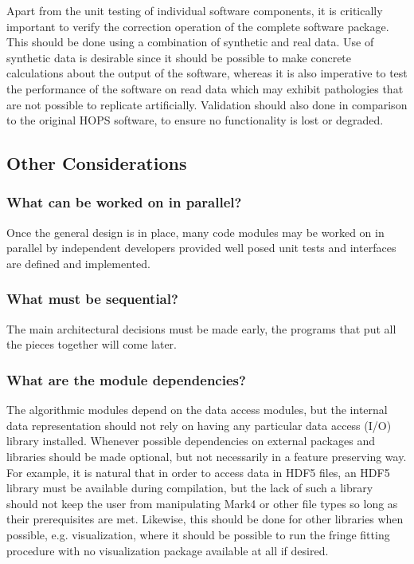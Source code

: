 Apart from the unit testing of individual software components, it is critically important to verify the correction operation of the complete software package. This should be done
using a combination of synthetic and real data. Use of synthetic data is desirable since it should be possible to make concrete calculations about the output of the software, whereas
it is also imperative to test the performance of the software on read data which may exhibit pathologies that are not possible to replicate artificially. Validation should also done
in comparison to the original HOPS software, to ensure no functionality is lost or degraded.

\subsection{Other Considerations}
\label{sec:otherstuff}


\subsubsection{What can be worked on in parallel?}
\label{sec:parallel-work}
Once the general design is in place, many code modules may
be worked on in parallel by independent developers provided
well posed unit tests and interfaces are defined and implemented.


\subsubsection{What must be sequential?}
\label{sec:sequential-work}
The main architectural decisions must be made early, the
programs that put all the pieces together will come later.

\subsubsection{What are the module dependencies?}
\label{sec:dependencies}
The algorithmic modules depend on the data access modules, but the internal data representation should not rely on having any particular data access (I/O) library installed. Whenever possible dependencies on external packages and libraries should be made optional, but not necessarily in a feature preserving way. For example,
it is natural that in order to access data in HDF5 files, an HDF5 library must be available during compilation, but the lack of such a library should not keep the user from manipulating Mark4 or other file types so
long as their prerequisites are met. Likewise, this should be done for other libraries when possible, e.g. visualization, where it should be possible to run the fringe fitting procedure with no visualization package available at all if desired.


